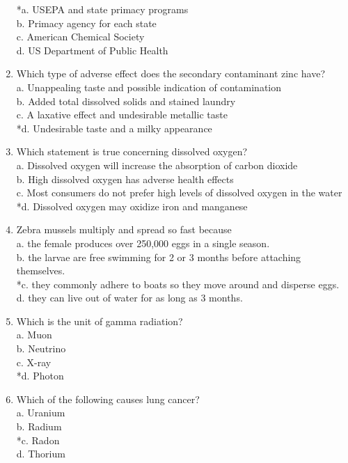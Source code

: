 \begin{enumerate}[1.]
*a. USEPA and state primacy programs\\
b. Primacy agency for each state\\
c. American Chemical Society\\
d. US Department of Public Health\\
\item Which type of adverse effect does the secondary contaminant zinc have?\\
a. Unappealing taste and possible indication of contamination\\
b. Added total dissolved solids and stained laundry\\
c. A laxative effect and undesirable metallic taste\\
*d. Undesirable taste and a milky appearance\\
\item Which statement is true concerning dissolved oxygen?\\
a. Dissolved oxygen will increase the absorption of carbon dioxide\\
b. High dissolved oxygen has adverse health effects\\
c. Most consumers do not prefer high levels of dissolved oxygen in the water\\
*d. Dissolved oxygen may oxidize iron and manganese\\
\item Zebra mussels multiply and spread so fast because\\
a. the female produces over 250,000 eggs in a single season.\\
b. the larvae are free swimming for 2 or 3 months before attaching themselves.\\
*c. they commonly adhere to boats so they move around and disperse eggs.\\
d. they can live out of water for as long as 3 months.\\
\item Which is the unit of gamma radiation?\\
a. Muon\\
b. Neutrino\\
c. X-ray\\
*d. Photon\\
\item Which of the following causes lung cancer?\\
a. Uranium\\
b. Radium\\
*c. Radon\\
d. Thorium\\

\end{enumerate}
